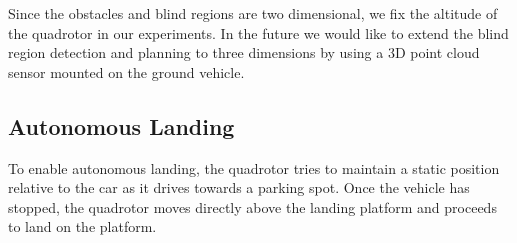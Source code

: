 Since the obstacles and blind regions are two dimensional, we fix the altitude
of the quadrotor in our experiments. In the future we would like to extend the
blind region detection and planning to three dimensions by using a 3D point
cloud sensor mounted on the ground vehicle.

\subsection{Autonomous Landing}

To enable autonomous landing, the quadrotor tries to maintain a static position
relative to the car as it drives towards a parking spot. Once the vehicle has
stopped, the quadrotor moves directly above the landing platform and proceeds
to land on the platform.
